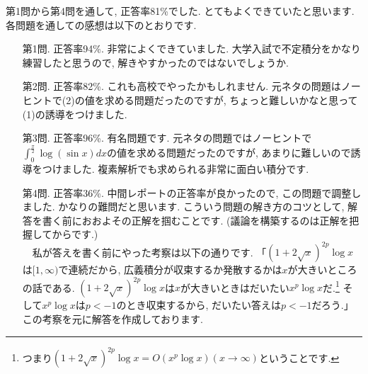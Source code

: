 \documentclass[dvipdfmx,a4paper,11pt]{article}
\theoremstyle{definition}
\begin{document}
   \hspace{-11pt}{\Large 期末レポートについて.}

第1問から第4問を通して, 正答率81\%でした. とてもよくできていたと思います. 
各問題を通しての感想は以下のとおりです.
\begin{itemize}
\item [第1問.] 正答率94\%. 非常によくできていました. 大学入試で不定積分をかなり練習したと思うので, 解きやすかったのではないでしょうか. 
\item [第2問.] 正答率82\%. これも高校でやったかもしれません. 元ネタの問題はノーヒントで(2)の値を求める問題だったのですが, ちょっと難しいかなと思って(1)の誘導をつけました.
\item [第3問.] 正答率96\%. 有名問題です. 元ネタの問題ではノーヒントで$\int_{0}^{\frac{\pi}{2}} \log (\sin x) dx$の値を求める問題だったのですが, あまりに難しいので誘導をつけました. 複素解析でも求められる非常に面白い積分です.
\item [第4問.] 正答率36\%. 中間レポートの正答率が良かったので, この問題で調整しました. かなりの難問だと思います. こういう問題の解き方のコツとして, 解答を書く前におおよその正解を掴むことです. (議論を構築するのは正解を把握してからです.) \\
　私が答えを書く前にやった考察は以下の通りです.
「$(1 + 2 \sqrt{x})^{2p} \log x$は$[1, \infty)$で連続だから, 広義積分が収束するか発散するかは$x$が大きいところの話である. $(1 + 2 \sqrt{x})^{2p} \log x$は$x$が大きいときはだいたい$x^p \log x$だ.\footnote{つまり$(1 + 2 \sqrt{x})^{2p} \log x = O(x^p \log x) (x \rightarrow \infty)$ということです.} そして$x^p \log x$は$p<-1$のとき収束するから, だいたい答えは$p<-1$だろう.」 
この考察を元に解答を作成しております. 
\end{itemize}
\end{document}
